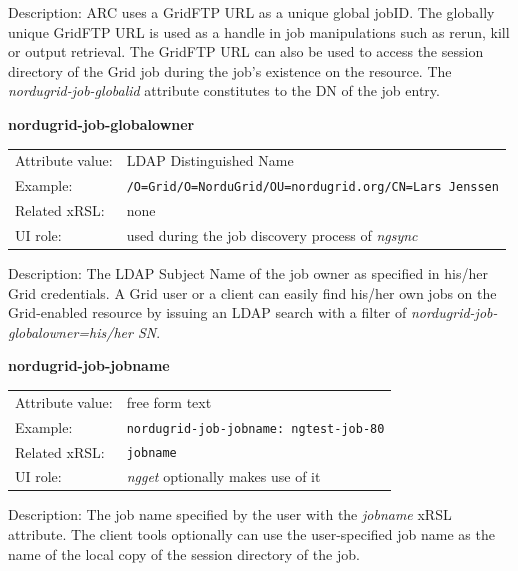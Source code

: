 \documentclass{article}
\begin{document}
Description: ARC uses a GridFTP URL as a unique global jobID. The globally 
unique GridFTP URL is used as a handle in job manipulations such as rerun,
kill or output retrieval. The GridFTP URL can also be used to access the 
session directory of the Grid job during the job's existence on the resource.
The {\it nordugrid-job-globalid} attribute constitutes to the DN of the job entry.


  \hspace*{0.5cm}
  \begin{shaded}
    \textbf{nordugrid-job-globalowner}
  \end{shaded}
  \begin{tabular}{lp{10cm}}  
    Attribute value:& LDAP Distinguished Name\\
    Example:& \verb#/O=Grid/O=NorduGrid/OU=nordugrid.org/CN=Lars Jenssen#\\
    Related xRSL:& none\\
    UI role:& used during the job discovery process of {\it ngsync}\\
  \end{tabular}

Description:  The LDAP Subject Name of the job owner as specified in his/her Grid credentials.
A Grid user or a client can easily find his/her own jobs on the Grid-enabled 
resource by issuing an LDAP search with a filter 
of {\it nordugrid-job-globalowner=his/her SN}.


  \hspace*{0.5cm}
  \begin{shaded}
    \textbf{nordugrid-job-jobname}
  \end{shaded}
  \begin{tabular}{lp{10cm}}  
    Attribute value:& free form text\\
    Example:& \verb#nordugrid-job-jobname: ngtest-job-80#\\
    Related xRSL:& \verb#jobname#\\
    UI role:& {\it ngget} optionally makes use of it\\ 
  \end{tabular}

Description:  The job name specified by the user with the {\it jobname} xRSL attribute.
The client tools optionally can use the user-specified job name as
the name of the local copy of the session directory of the job.
\end{document}
